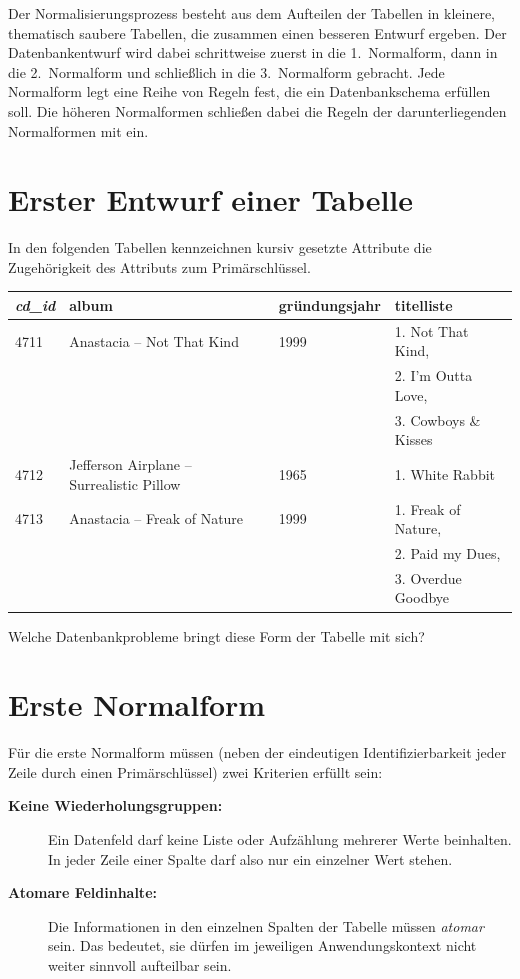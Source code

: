 Der Normalisierungsprozess besteht aus dem Aufteilen der Tabellen in kleinere,
thematisch saubere Tabellen, die zusammen einen besseren Entwurf ergeben. Der
Datenbankentwurf wird dabei schrittweise zuerst in die 1.~Normalform, dann in
die 2.~Normalform und schließlich in die 3.~Normalform gebracht. Jede Normalform
legt eine Reihe von Regeln fest, die ein Datenbankschema erfüllen soll. Die
höheren Normalformen schließen dabei die Regeln der darunterliegenden
Normalformen mit ein.


\section{Erster Entwurf einer Tabelle}

In den folgenden Tabellen kennzeichnen kursiv gesetzte Attribute die
Zugehörigkeit des Attributs zum Primärschlüssel.

\begin{center}
\begin{tabular}{|l|l|l|l|}
\hline
\textbf{\em cd\_id} & \textbf{album} & \textbf{gründungsjahr} &
\textbf{titelliste} \\ \hline
4711 & Anastacia -- Not That Kind & 1999 & 1. Not That Kind, 
\\
& & & 2. I'm Outta Love, \\
& & & 3. Cowboys \& Kisses \\ \hline 
4712 & Jefferson Airplane -- Surrealistic Pillow & 1965 & 1. White Rabbit \\
\hline
4713 & Anastacia -- Freak of Nature & 1999 & 1. Freak of Nature, \\
& & &  2. Paid my Dues, \\
& & & 3. Overdue Goodbye \\ \hline
\end{tabular}
\end{center}

Welche Datenbankprobleme bringt diese Form der Tabelle mit sich?


\section{Erste Normalform}

Für die erste Normalform müssen (neben der eindeutigen Identifizierbarkeit
jeder Zeile durch einen Primärschlüssel) zwei Kriterien erfüllt sein:

\begin{description}
\item[\textbf{Keine Wiederholungsgruppen:}] Ein Datenfeld darf keine Liste 
oder Aufzählung mehrerer Werte beinhalten. In jeder Zeile einer Spalte 
darf also nur ein einzelner Wert stehen.

\item[\textbf{Atomare Feldinhalte:}] Die Informationen in den einzelnen 
Spalten der Tabelle müssen \emph{atomar} sein. Das bedeutet, sie dürfen im 
jeweiligen Anwendungskontext nicht weiter sinnvoll aufteilbar sein.
\end{description}

